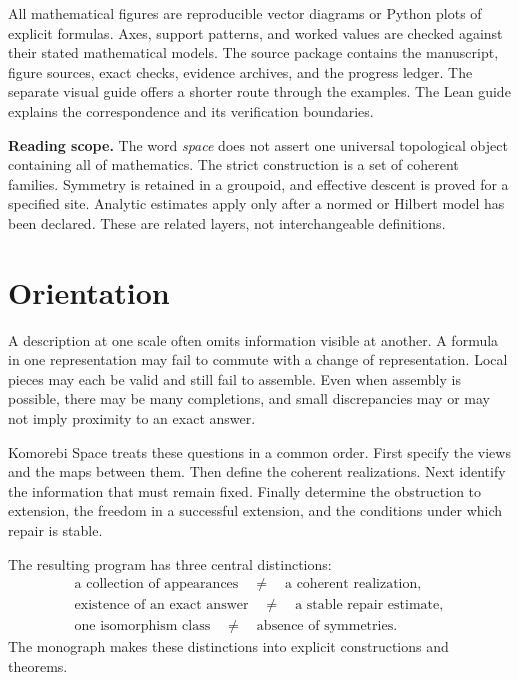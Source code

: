 \documentclass[11pt]{article}
\begin{document}
All mathematical figures are reproducible vector diagrams or Python plots of explicit formulas. Axes, support patterns, and worked values are checked against their stated mathematical models. The source package contains the manuscript, figure sources, exact checks, evidence archives, and the progress ledger. The separate visual guide offers a shorter route through the examples. The Lean guide explains the correspondence and its verification boundaries.

\begin{scopebox}
\textbf{Reading scope.} The word \emph{space} does not assert one universal topological object containing all of mathematics. The strict construction is a set of coherent families. Symmetry is retained in a groupoid, and effective descent is proved for a specified site. Analytic estimates apply only after a normed or Hilbert model has been declared. These are related layers, not interchangeable definitions.
\end{scopebox}

\clearpage
\section*{Orientation}
A description at one scale often omits information visible at another. A formula in one representation may fail to commute with a change of representation. Local pieces may each be valid and still fail to assemble. Even when assembly is possible, there may be many completions, and small discrepancies may or may not imply proximity to an exact answer.

Komorebi Space treats these questions in a common order. First specify the views and the maps between them. Then define the coherent realizations. Next identify the information that must remain fixed. Finally determine the obstruction to extension, the freedom in a successful extension, and the conditions under which repair is stable.

The resulting program has three central distinctions:
\[
\begin{gathered}
\text{a collection of appearances}\quad\ne\quad\text{a coherent realization},\\
\text{existence of an exact answer}\quad\ne\quad\text{a stable repair estimate},\\
\text{one isomorphism class}\quad\ne\quad\text{absence of symmetries}.
\end{gathered}
\]
The monograph makes these distinctions into explicit constructions and theorems.
\end{document}
